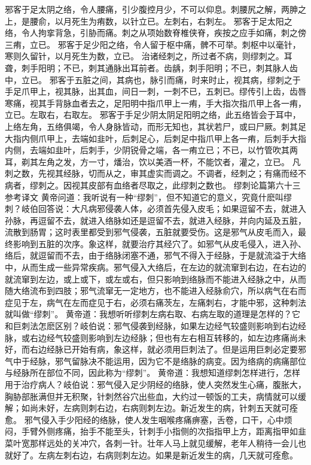 \documentclass[a4paper,12pt,UTF8,twoside]{ctexbook}
\begin{document}
邪客于足太阴之络，令人腰痛，引少腹控月少，不可以仰息。刺腰尻之解，两胂之上，是腰俞，以月死生为痏数，以针立已。左刺右，右刺左。
邪客于足太阳之络，令人拘挛背急，引胁而痛。刺之从项始数脊椎侠脊，疾按之应手如痛，刺之傍三痏，立已。
邪客于足少阳之络，令人留于枢中痛，髀不可举。刺枢中以毫针，寒则久留针，以月死生为数，立已。
治诸经刺之，所过者不病，则缪刺之。耳聋，刺手阳明；不已，刺其通脉出耳前者。齿龋，刺手阳明；不已，刺其脉人齿中，立已。
邪客于五脏之间，其病也，脉引而痛，时来时止，视其病，缪刺之于手足爪甲上，视其脉，出其血，间日一刺，一刺不已，五刺已。缪传引上齿，齿唇寒痛，视其手背脉血者去之，足阳明中指爪甲上一痏，手大指次指爪甲上各一痏，立已。左取右，右取左。
邪客于手足少阴太阴足阳明之络，此五络皆会于耳中，上络左角，五络俱竭，令人身脉皆动，而形无知也，其状若尸，或曰尸厥。刺其足大指内侧爪甲上，去端如韭叶，后刺足心，后刺足中指爪甲上各一痏，后刺手大指内侧，去端如韭叶，后刺手，少阴锐骨之端，各一痏立已；不已，以竹管吹其两耳，剃其左角之发，方一寸，燔治，饮以美酒一杯，不能饮者，灌之，立已。
凡刺之数，先视其经脉，切而从之，审其虚实而调之。不调者，经刺之；有痛而经不病者，缪刺之。因视其皮部有血络者尽取之，此缪刺之数也。
缪刺论篇第六十三参考译文
黄帝问道：我听说有一种“缪刺”，但不知道它的意义，究竟什麽叫缪刺？岐伯回答说：大凡病邪侵袭人体，必须首先侵入皮毛；如果逗留不去，就进入孙脉，再逗留不去，就进入络脉如还是逗留不去，就进入经脉，并向内延及五脏，流散到肠胃；这时表里都受到邪气侵袭，五脏就要受伤。这是邪气从皮毛而入，最终影响到五脏的次序。象这样，就要治疗其经穴了。如邪气从皮毛侵入，进入孙、络后，就逗留而不去，由于络脉闭塞不通，邪气不得入于经脉，于是就流溢于大络中，从而生成一些异常疾病。邪气侵入大络后，在左边的就流窜到右边，在右边的就流窜到左边，或上或下，或左或右，但只影响到络脉而不能进入经脉之中，从而随大络流布到四肢；邪气流窜无一定地方，也不能进入经脉俞穴，所以病气在右而症见于左，病气在左而症见于右，必须右痛茨左，左痛刺右，才能中邪，这种刺法就叫做“缪刺”。
黄帝道：我想听听缪刺左病右取、右病左取的道理是怎样的？它和巨刺法怎麽区别？岐伯说：邪气侵袭到经脉，如果左边经气较盛则影响到右边经脉，或右边经气较盛则影响到左边经脉；但也有左右相互转移的，如左边疼痛尚未好，而右边经脉已开始有病，象这样，就必须用巨刺法了。但是运用巨刺必定要邪气中于经脉，邪气留脉决不能运用，因为它不是络脉的病变。因为络病的病痛部位与经脉所在部位不同，因此称为“缪刺”。
黄帝道：我想知道缪刺怎样进行，怎样用于治疗病人？岐伯说：邪气侵入足少阴经的络脉，使人突然发生心痛，腹胀大，胸胁部胀满但并无积聚，针刺然谷穴出些血，大约过一顿饭的工夫，病情就可以缓解；如尚未好，左病则刺右边，右病则刺左边。新近发生的病，针刺五天就可痊愈。
邪气侵入手少阳经的络脉，使人发生咽喉疼痛痹塞，舌卷，口干，心中烦闷，手臂外侧疼痛，抬手不能至头，针刺手小指侧的次指指甲上方，距离指甲如韭菜叶宽那样远处的关冲穴，各刺一针。壮年人马上就见缓解，老年人稍待一会儿也就好了。左病左刺右边，右病则刺左边。如果是新近发生的病，几天就可痊愈。
\end{document}
